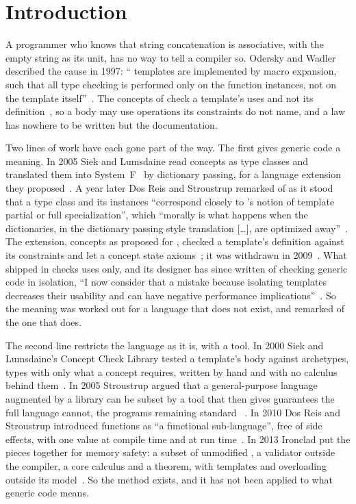 \section{Introduction}
\label{sec:intro}

A programmer who knows that string concatenation is associative, with the empty string as its unit, has no way to tell a \Cpp{} compiler so.
Odersky and Wadler described the cause in 1997: ``\Cpp{} templates are implemented by macro expansion, such that all type checking is performed only on the function instances, not on the template itself''~\cite[\S 1]{odersky1997pizza}.
The concepts of  check a template's uses and not its definition~\cite{stroustrup2020thriving}, so a body may use operations its constraints do not name, and a law has nowhere to be written but the documentation.

Two lines of work have each gone part of the way.
The first gives generic code a meaning.
In 2005 Siek and Lumsdaine read concepts as type classes and translated them into System~F~\cite{girard1972interpretation,reynolds1974towards} by dictionary passing, for a language extension they proposed~\cite{siek2005essential}.
A year later Dos Reis and Stroustrup remarked of \Cpp{} as it stood that a type class and its instances ``correspond closely to \Cpp{}'s notion of template partial or full specialization'', which ``morally is what happens when the dictionaries, in the dictionary passing style translation [\ldots], are optimized away''~\cite[Section~6.2]{dosreis2006specifying}.
The extension, concepts as proposed for , checked a template's definition against its constraints and let a concept state axioms~\cite{gregor2006concepts,bagge2009axioms}; it was withdrawn in 2009~\cite{stroustrup2009remove}.
What shipped in  checks uses only, and its designer has since written of checking generic code in isolation, ``I now consider that a mistake because isolating templates decreases their usability and can have negative performance implications''~\cite[Section~7.7]{stroustrup2025concept}.
So the meaning was worked out for a language that does not exist, and remarked of the one that does.

The second line restricts the language as it is, with a tool.
In 2000 Siek and Lumsdaine's Concept Check Library tested a template's body against archetypes, types with only what a concept requires, written by hand and with no calculus behind them~\cite{siek2000concept}.
In 2005 Stroustrup argued that a general-purpose language augmented by a library can be subset by a tool that then gives guarantees the full language cannot, the programs remaining standard \Cpp{}~\cite{stroustrup2005sell}.
In 2010 Dos Reis and Stroustrup introduced  functions as ``a functional sub-language'', free of side effects, with one value at compile time and at run time~\cite{dosreis2010constexpr}.
In 2013 Ironclad \Cpp{} put the pieces together for memory safety: a subset of unmodified \Cpp{}, a validator outside the compiler, a core calculus and a theorem, with templates and overloading outside its model~\cite{delozier2013ironclad}.
So the method exists, and it has not been applied to what generic code means.

